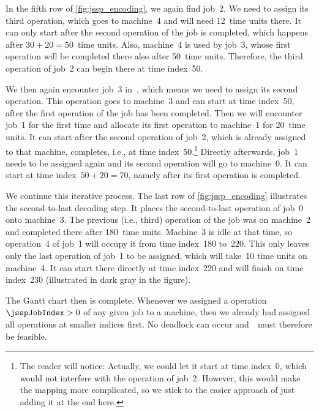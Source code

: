 In the fifth row of \autoref{fig:jssp_encoding}, we again find job~2.
We need to assign its third operation, which goes to machine~4 and will need 12~time units there.
It can only start after the second operation of the job is completed, which happens after $30+20=50$~time units.
Also, machine~4 is used by job~3, whose first operation will be completed there also after 50~time units.
Therefore, the third operation of job~2 can begin there at time index~50.

We then again encounter job~3 in~\sespel, which means we need to assign its second operation.
This operation goes to machine~3 and can start at time index~50, after the first operation of the job has been completed.
Then we will encounter job~1 for the first time and allocate its first operation to machine~1 for 20~time units.
It can start after the second operation of job~2, which is already assigned to that machine, completes, i.e., at time index~50.\footnote{%
The reader will notice: %
Actually, we could let it start at time index~0, which would not interfere with the operation of job~2. %
However, this would make the mapping more complicated, so we stick to the easier approach of just adding it at the end here.}
Directly afterwards, job~1 needs to be assigned again and its second operation will go to machine~0.
It can start at time index~$50+20=70$, namely after its first operation is completed.

We continue this iterative process.
The last row of \autoref{fig:jssp_encoding} illustrates the second-to-last decoding step.
It places the second-to-last operation of job~0 onto machine~3.
The previous (i.e., third) operation of the job was on machine~2 and completed there after 180~time units.
Machine~3 is idle at that time, so operation~4 of job~1 will occupy it from time index~180 to~220.
This only leaves only the last operation of job~1 to be assigned, which will take~10 time units on machine~4.
It can start there directly at time index~220 and will finish on time index~230 (illustrated in dark gray in the figure).

The Gantt chart then is complete.
Whenever we assigned a operation~$\jsspJobIndex>0$ of any given job to a machine, then we already had assigned all operations at smaller indices first.
No deadlock can occur and~\solspel\ must therefore be feasible.


